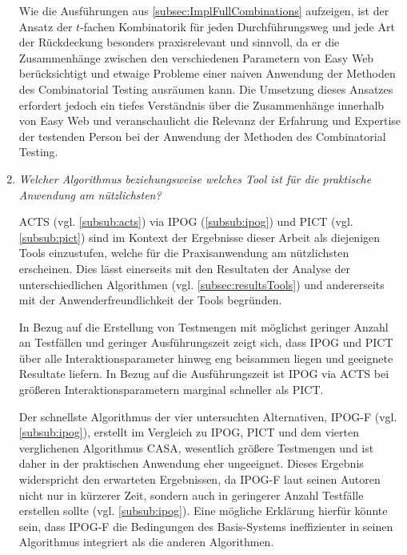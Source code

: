 \begin{enumerate}
Wie die Ausführungen aus \autoref{subsec:ImplFullCombinations} aufzeigen, ist der Ansatz der $t$-fachen Kombinatorik für jeden Durchführungsweg und jede Art der Rückdeckung besonders praxisrelevant und sinnvoll, da er die Zusammenhänge zwischen den verschiedenen Parametern von Easy Web berücksichtigt und etwaige Probleme einer naiven Anwendung der Methoden des Combinatorial Testing ausräumen kann. Die Umsetzung dieses Ansatzes erfordert jedoch ein tiefes Verständnis über die Zusammenhänge innerhalb von Easy Web und veranschaulicht die Relevanz der Erfahrung und Expertise der testenden Person bei der Anwendung der Methoden des Combinatorial Testing.

\item \textit{Welcher Algorithmus beziehungsweise welches Tool ist für die praktische Anwendung am nützlichsten?}

ACTS (vgl. \autoref{subsub:acts}) via IPOG (\autoref{subsub:ipog}) und PICT (vgl. \autoref{subsub:pict}) sind im Kontext der Ergebnisse dieser Arbeit als diejenigen Tools einzustufen, welche für die Praxisanwendung am nützlichsten erscheinen. Dies lässt einerseits mit den Resultaten der Analyse der unterschiedlichen Algorithmen (vgl. \autoref{subsec:resultsTools}) und andererseits mit der Anwenderfreundlichkeit der Tools begründen.

In Bezug auf die Erstellung von Testmengen mit möglichst geringer Anzahl an Testfällen und geringer Ausführungszeit zeigt sich, dass IPOG und PICT über alle Interaktionsparameter hinweg eng beisammen liegen und geeignete Resultate liefern. In Bezug auf die Ausführungszeit ist IPOG via ACTS bei größeren Interaktionsparametern marginal schneller als PICT. 

Der schnellste Algorithmus der vier untersuchten Alternativen, IPOG-F (vgl. \autoref{subsub:ipog}), erstellt im Vergleich zu IPOG, PICT und dem vierten verglichenen Algorithmus CASA, wesentlich größere Testmengen und ist daher in der praktischen Anwendung eher ungeeignet. Dieses Ergebnis widerspricht den erwarteten Ergebnissen, da IPOG-F laut seinen Autoren nicht nur in kürzerer Zeit, sondern auch in geringerer Anzahl Testfälle erstellen sollte (vgl. \autoref{subsub:ipog}). Eine mögliche Erklärung hierfür könnte sein, dass IPOG-F die Bedingungen des Basis-Systems ineffizienter in seinen Algorithmus integriert als die anderen Algorithmen.


\end{enumerate}
